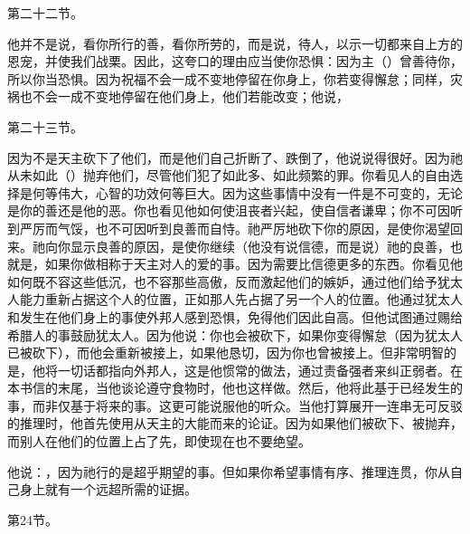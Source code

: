 第二十二节。\par

他并不是说，看你所行的善，看你所劳的，而是说，待人，以示一切都来自上方的恩宠，并使我们战栗。因此，这夸口的理由应当使你恐惧：因为主（）曾善待你，所以你当恐惧。因为祝福不会一成不变地停留在你身上，你若变得懈怠；同样，灾祸也不会一成不变地停留在他们身上，他们若能改变；他说，\par

第二十三节。\par

因为不是天主砍下了他们，而是他们自己折断了、跌倒了，他说说得很好。因为祂从未如此（）抛弃他们，尽管他们犯了如此多、如此频繁的罪。你看见人的自由选择是何等伟大，心智的功效何等巨大。因为这些事情中没有一件是不可变的，无论是你的善还是他的恶。你也看见他如何使沮丧者兴起，使自信者谦卑；你不可因听到严厉而气馁，也不可因听到良善而自恃。祂严厉地砍下你的原因，是使你渴望回来。祂向你显示良善的原因，是使你继续（他没有说信德，而是说）祂的良善，也就是，如果你做相称于天主对人的爱的事。因为需要比信德更多的东西。你看见他如何既不容这些低沉，也不容那些高傲，反而激起他们的嫉妒，通过他们给予犹太人能力重新占据这个人的位置，正如那人先占据了另一个人的位置。他通过犹太人和发生在他们身上的事使外邦人感到恐惧，免得他们因此自高。但他试图通过赐给希腊人的事鼓励犹太人。因为他说：你也会被砍下，如果你变得懈怠（因为犹太人已被砍下），而他会重新被接上，如果他恳切，因为你也曾被接上。但非常明智的是，他将一切话都指向外邦人，这是他惯常的做法，通过责备强者来纠正弱者。在本书信的末尾，当他谈论遵守食物时，他也这样做。然后，他将此基于已经发生的事，而非仅基于将来的事。这更可能说服他的听众。当他打算展开一连串无可反驳的推理时，他首先使用从天主的大能而来的论证。因为如果他们被砍下、被抛弃，而别人在他们的位置上占了先，即使现在也不要绝望。\par

他说：，因为祂行的是超乎期望的事。但如果你希望事情有序、推理连贯，你从自己身上就有一个远超所需的证据。\par

第24节。\par

